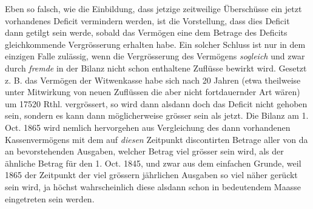 Eben so falsch, wie die Einbildung, dass jetzige zeitweilige Überschüsse ein jetzt vorhandenes Deficit vermindern werden, ist die Vorstellung, dass dies Deficit dann getilgt sein werde, sobald das Vermögen eine dem Betrage des Deficits gleichkommende Vergrösserung erhalten habe. Ein solcher Schluss ist nur in dem einzigen Falle zulässig, wenn die Vergrösserung des Vermögens \textit{sogleich} und zwar durch \textit{fremde} in der Bilanz nicht schon enthaltene Zuflüsse bewirkt wird. Gesetzt z. B. das Vermögen der Witwenkasse habe sich nach 20 Jahren (etwa theilweise unter Mitwirkung von neuen Zuflüssen die aber nicht fortdauernder Art wären) um 17520 Rthl. vergrössert, so wird dann alsdann doch das Deficit nicht gehoben sein, sondern es kann dann möglicherweise grösser sein als jetzt. Die Bilanz am 1. Oct. 1865 wird nemlich hervorgehen aus Vergleichung des dann vorhandenen Kassenvermögens mit dem auf \textit{diesen} Zeitpunkt discontirten Betrage aller von da an bevorstehenden Ausgaben, welcher Betrag viel grösser sein wird, als der ähnliche Betrag für den 1. Oct. 1845, und zwar aus dem einfachen Grunde, weil 1865 der Zeitpunkt der viel grössern jährlichen Ausgaben so viel näher gerückt sein wird, ja höchst wahrscheinlich diese alsdann schon in bedeutendem Maasse eingetreten sein werden.
